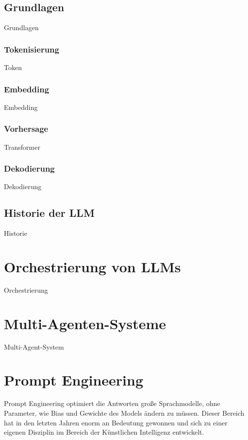 \subsection{Grundlagen}
Grundlagen

\subsubsection{Tokenisierung}
Token

\subsubsection{Embedding}
Embedding

\subsubsection{Vorhersage}
Transformer

\subsubsection{Dekodierung}
Dekodierung

\subsection{Historie der LLM}
Historie



\section{Orchestrierung von LLMs}
Orchestrierung

\section{Multi-Agenten-Systeme}
Multi-Agent-System



\section{Prompt Engineering}
Prompt Engineering optimiert die Antworten große Sprachmodelle, ohne Parameter, wie Bias und Gewichte des Models ändern zu müssen. Dieser Bereich hat in den letzten Jahren enorm an Bedeutung gewonnen und sich zu einer eigenen Disziplin im Bereich der Künstlichen Intelligenz entwickelt.\vspace{0.2cm}

